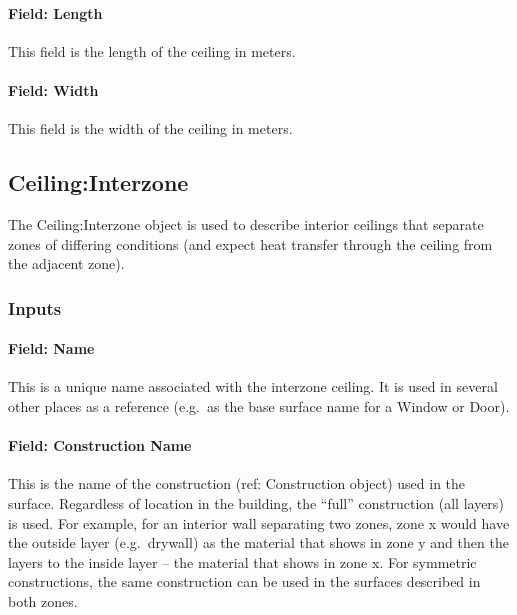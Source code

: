 \paragraph{Field: Length}\label{field-length-5}

This field is the length of the ceiling in meters.

\paragraph{Field: Width}\label{field-width-1}

This field is the width of the ceiling in meters.

\subsection{Ceiling:Interzone}\label{ceilinginterzone}

The Ceiling:Interzone object is used to describe interior ceilings that separate zones of differing conditions (and expect heat transfer through the ceiling from the adjacent zone).

\subsubsection{Inputs}\label{inputs-10-022}

\paragraph{Field: Name}\label{field-name-6-024}

This is a unique name associated with the interzone ceiling. It is used in several other places as a reference (e.g.~as the base surface name for a Window or Door).

\paragraph{Field: Construction Name}\label{field-construction-name-6}

This is the name of the construction (ref: Construction object) used in the surface. Regardless of location in the building, the ``full'' construction (all layers) is used. For example, for an interior wall separating two zones, zone x would have the outside layer (e.g.~drywall) as the material that shows in zone y and then the layers to the inside layer -- the material that shows in zone x. For symmetric constructions, the same construction can be used in the surfaces described in both zones.

